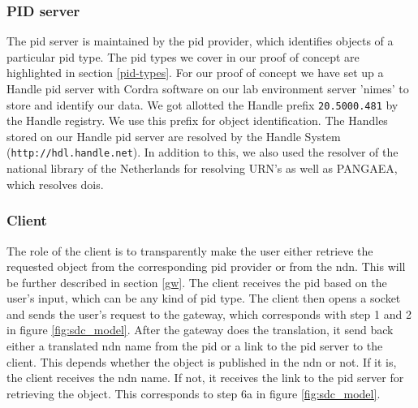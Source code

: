 \subsubsection{PID server}
The \gls{pid} server is maintained by the \gls{pid} provider, which identifies objects of a particular \gls{pid} type. The \gls{pid} types we cover in our proof of concept are highlighted in section \ref{pid-types}. For our proof of concept we have set up a Handle \gls{pid} server with Cordra software \cite{cor} on our lab environment server 'nimes' to store and identify our data. We got allotted the Handle prefix \texttt{20.5000.481} by the Handle registry. We use this prefix for object identification. The Handles stored on our Handle \gls{pid} server are resolved by the Handle System (\texttt{http://hdl.handle.net}). In addition to this, we also used the resolver of the national library of the Netherlands for resolving URN's as well as PANGAEA, which resolves \glspl{doi}. 

\subsubsection{Client}\label{client}
The role of the client is to transparently make the user either retrieve the requested object from the corresponding \gls{pid} provider or from the \gls{ndn}. This will be further described in section \ref{gw}. The client receives the \gls{pid} based on the user's input, which can be any kind of \gls{pid} type. The client then opens a socket and sends the user's request to the gateway, which corresponds with step 1 and 2 in figure \ref{fig:sdc_model}. After the gateway does the translation, it send back either a translated \gls{ndn} name from the \gls{pid} or a link to the \gls{pid} server to the client. This depends whether the object is published in the \gls{ndn} or not. If it is, the client receives the \gls{ndn} name. If not, it receives the link to the \gls{pid} server for retrieving the object. This corresponds to step 6a in figure \ref{fig:sdc_model}.

